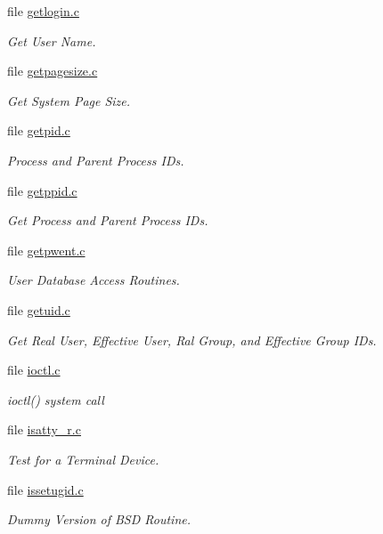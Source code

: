 \begin{DoxyCompactItemize}
file \mbox{\hyperlink{getlogin_8c}{getlogin.\+c}}
\begin{DoxyCompactList}\small\item\em Get User Name. \end{DoxyCompactList}\item 
file \mbox{\hyperlink{getpagesize_8c}{getpagesize.\+c}}
\begin{DoxyCompactList}\small\item\em Get System Page Size. \end{DoxyCompactList}\item 
file \mbox{\hyperlink{getpid_8c}{getpid.\+c}}
\begin{DoxyCompactList}\small\item\em Process and Parent Process I\+Ds. \end{DoxyCompactList}\item 
file \mbox{\hyperlink{getppid_8c}{getppid.\+c}}
\begin{DoxyCompactList}\small\item\em Get Process and Parent Process I\+Ds. \end{DoxyCompactList}\item 
file \mbox{\hyperlink{getpwent_8c}{getpwent.\+c}}
\begin{DoxyCompactList}\small\item\em User Database Access Routines. \end{DoxyCompactList}\item 
file \mbox{\hyperlink{getuid_8c}{getuid.\+c}}
\begin{DoxyCompactList}\small\item\em Get Real User, Effective User, Ral Group, and Effective Group I\+Ds. \end{DoxyCompactList}\item 
file \mbox{\hyperlink{ioctl_8c}{ioctl.\+c}}
\begin{DoxyCompactList}\small\item\em ioctl() system call \end{DoxyCompactList}\item 
file \mbox{\hyperlink{isatty__r_8c}{isatty\+\_\+r.\+c}}
\begin{DoxyCompactList}\small\item\em Test for a Terminal Device. \end{DoxyCompactList}\item 
file \mbox{\hyperlink{issetugid_8c}{issetugid.\+c}}
\begin{DoxyCompactList}\small\item\em Dummy Version of B\+SD Routine. \end{DoxyCompactList}\item 

\end{DoxyCompactItemize}
